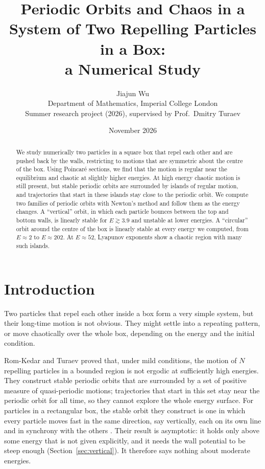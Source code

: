 \documentclass[11pt,a4paper]{article}
\title{Periodic Orbits and Chaos in a System of Two Repelling Particles in a Box:\\
a Numerical Study}
\author{Jiajun Wu\\[2pt]
\small Department of Mathematics, Imperial College London\\
\small Summer research project (2026), supervised by Prof.\ Dmitry Turaev}
\date{November 2026}
\begin{document}
\maketitle

\begin{abstract}
We study numerically two particles in a square box that repel each other and
are pushed back by the walls, restricting to motions that are symmetric about
the centre of the box. Using Poincar\'e sections, we find that the motion is
regular near the equilibrium and chaotic at slightly higher energies. At high
energy chaotic motion is still present, but stable periodic orbits are
surrounded by islands of regular motion, and trajectories that start in these
islands stay close to the periodic orbit. We compute two families of periodic orbits with Newton's method and
follow them as the energy changes. A ``vertical'' orbit, in which each particle
bounces between the top and bottom walls, is linearly stable for $E\gtrsim3.9$
and unstable at lower energies. A ``circular'' orbit around the centre of the box
is linearly stable at every energy we computed, from $E\approx2$ to
$E\approx202$. At $E\approx52$, Lyapunov exponents show a chaotic region with
many such islands.
\end{abstract}

\section{Introduction}\label{sec:intro}

Two particles that repel each other inside a box form a very simple system,
but their long-time motion is not obvious. They might settle into a repeating
pattern, or move chaotically over the whole box, depending on the energy and
the initial condition.

Rom-Kedar and Turaev \cite{turaev2022} proved that, under mild conditions,
the motion of $N$ repelling particles in a bounded region is not ergodic at
sufficiently high energies. They construct stable periodic orbits that are
surrounded by a set of positive measure of quasi-periodic motions; trajectories
that start in this set stay near the periodic orbit for all time, so they
cannot explore the whole energy surface. For particles in a rectangular box,
the stable orbit they construct is one in which every particle moves fast in
the same direction, say vertically, each on its own line and in synchrony with
the others \cite[Sec.~2.6]{turaev2022}. Their result is asymptotic: it holds
only above some energy that is not given explicitly, and it needs the wall
potential to be steep enough (Section~\ref{sec:vertical}). It therefore says
nothing about moderate energies.
\end{document}
